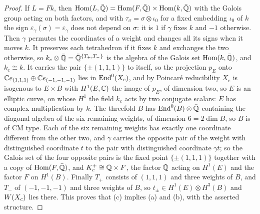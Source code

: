 \begin{proof}
If $L=Fk$, then $\operatorname{Hom}(L,\bar{\mathbb{Q}})=\operatorname{Hom}(F,\bar{\mathbb{Q}})
\times\operatorname{Hom}(k,\bar{\mathbb{Q}})$ with the Galois group acting on both
factors, and with $\tau_{\sigma}=\sigma\otimes\iota_{0}$ for a fixed
embedding $\iota_{0}$ of $k$ the sign $\varepsilon_{\gamma}(\sigma)
=\varepsilon_{\gamma}$ does not depend on $\sigma$: it is $1$ if $\gamma$
fixes $k$ and $-1$ otherwise. Then $\gamma$ permutes the coordinates of a
weight and changes all its signs when it moves $k$. It preserves each
tetrahedron if it fixes $k$ and exchanges the two otherwise, so
$k_{c}\otimes\bar{\mathbb{Q}}=\bar{\mathbb{Q}}^{\{T_{+},T_{-}\}}$ is the algebra of the
Galois set $\operatorname{Hom}(k,\bar{\mathbb{Q}})$, and $k_{c}\cong k$. It carries
the pair $\{\pm(1,1,1)\}$ to itself, so the projection $p_{E}$ onto
$\mathbb{C} e_{(1,1,1)}\oplus\mathbb{C} e_{(-1,-1,-1)}$ lies in $\operatorname{End}^{0}(X_{c})$, and by
Poincar\'e reducibility $X_{c}$ is isogenous to $E\times B$ with
$H^{1}(E,\mathbb{C})$ the image of $p_{E}$, of dimension two, so $E$ is an
elliptic curve, on whose $H^{1}$ the field $k_{c}$ acts by two conjugate
scalars: $E$ has complex multiplication by $k$. The threefold $B$ has
$\operatorname{End}^{0}(B)\otimes\bar{\mathbb{Q}}$ containing the diagonal algebra of the six
remaining weights, of dimension $6=2\dim B$, so $B$ is of CM type. Each of
the six remaining weights has exactly one coordinate different from the
other two, and $\gamma$ carries the opposite pair of the weight with
distinguished coordinate $t$ to the pair with distinguished coordinate
$\gamma t$; so the Galois set of the four opposite pairs is the fixed point
$\{\pm(1,1,1)\}$ together with a copy of $\operatorname{Hom}(F,\bar{\mathbb{Q}})$,
and $K_{c}^{+}\cong\mathbb{Q}\times F$, the factor $\mathbb{Q}$ acting on $H^{1}(E)$ and
the factor $F$ on $H^{1}(B)$. Finally $T_{+}$ consists of $(1,1,1)$ and
three weights of $B$, and $T_{-}$ of $(-1,-1,-1)$ and three weights of $B$,
so $t_{\pm}\in H^{1}(E)\otimes H^{3}(B)$ and $W(X_{c})$ lies there. This
proves that (c) implies (a) and (b), with the asserted structure.


\end{proof}
